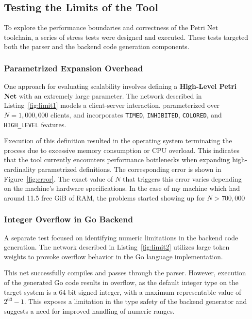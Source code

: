 \documentclass[12pt]{article}
\begin{document}
    \subsection{Testing the Limits of the Tool}   
        To explore the performance boundaries and correctness of the Petri Net toolchain, a series of stress tests were designed and executed. These tests targeted both the parser and the backend code generation components.
        \subsubsection{Parametrized Expansion Overhead}
            One approach for evaluating scalability involves defining a \textbf{High-Level Petri Net} with an extremely large parameter. The network described in Listing~\ref{fig:limit1} models a client-server interaction, parameterized over $N = 1{,}000{,}000$ clients, and incorporates \texttt{TIMED}, \texttt{INHIBITED}, \texttt{COLORED}, and \texttt{HIGH\_LEVEL} features.

            Execution of this definition resulted in the operating system terminating the process due to excessive memory consumption or CPU overload. This indicates that the tool currently encounters performance bottlenecks when expanding high-cardinality parametrized definitions. The corresponding error is shown in Figure~\ref{fig:error}. The exact value of $N$ that triggers this error varies depending on the machine's hardware specifications. In the case of my machine which had around 11.5 free GiB of RAM, the problems started showing up for $N > 700{,}000$

        \subsubsection{Integer Overflow in Go Backend}
            A separate test focused on identifying numeric limitations in the backend code generation. The network described in Listing~\ref{fig:limit2} utilizes large token weights to provoke overflow behavior in the Go language implementation.

            This net successfully compiles and passes through the parser. However, execution of the generated Go code results in overflow, as the default integer type on the target system is a 64-bit signed integer, with a maximum representable value of $2^{63} - 1$. This exposes a limitation in the type safety of the backend generator and suggests a need for improved handling of numeric ranges.
\end{document}
